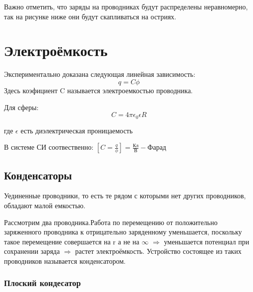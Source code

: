 \documentclass[../main.tex]{subfiles}
\begin{document}
Важно отметить, что заряды на проводниках будут распределены неравномерно, так на рисунке ниже они будут скапливаться на остриях.

\section{Электроёмкость}
Экспериментально доказана следующая линейная зависимость:
\[q = C \phi\]
Здесь коэфициент C называется электроемкостью проводника.

Для сферы:
\[ C = 4 \pi \epsilon_0 \epsilon R\]
\begin{center}
    где $\epsilon$ есть диэлектрическая проницаемость
\end{center}
В системе СИ соотвественно: $[C = \frac{q}{\phi}] = \frac{\text{Кл}}{\text{В}} - Фарад$
\subsection{Конденсаторы}
Уединенные проводники, то есть те рядом с которыми нет других проводников, обладают малой емкостью.

Рассмотрим два проводника.Работа по перемещению от положительно заряженного проводника к отрицательно заряденному уменьшается, поскольку
такое перемещение совершается на r а не на $\infty$ $\Rightarrow$ уменьшается потенциал при сохранении заряда $\Rightarrow$
растет электроёмкость.
Устройство состоящее из таких проводников называется конденсатором.


\subsubsection{Плоский кондесатор}
\end{document}
